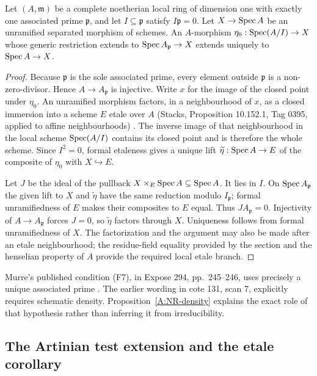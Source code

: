 \begin{proposition}\label{A:NR-density}
Let $(A,\mathfrak m)$ be a complete noetherian local ring of dimension one
with exactly one associated prime $\mathfrak p$, and let $I\subseteq
\mathfrak p$ satisfy $I\mathfrak p=0$. Let $X\to\operatorname{Spec} A$ be an
unramified separated morphism of schemes. An $A$-morphism
$\eta_0:\operatorname{Spec}(A/I)\to X$ whose generic restriction extends to
$\operatorname{Spec} A_{\mathfrak p}\to X$ extends uniquely to $\operatorname{Spec} A\to X$.
\end{proposition}
\begin{proof}
Because $\mathfrak p$ is the sole associated prime, every element outside
$\mathfrak p$ is a non-zero-divisor. Hence $A\to A_{\mathfrak p}$ is
injective. Write $x$ for the image of the closed point under $\eta_0$.
An unramified morphism factors, in a neighbourhood of $x$, as a closed
immersion into a scheme $E$ etale over $A$ (Stacks, Proposition 10.152.1,
Tag 0395, applied to affine neighbourhoods) \cite{Stacks0395}. The inverse image of that
neighbourhood in the local scheme $\operatorname{Spec}(A/I)$ contains its closed point
and is therefore the whole scheme. Since $I^2=0$, formal etaleness gives
a unique lift $\widetilde\eta:\operatorname{Spec} A\to E$ of the composite of $\eta_0$
with $X\hookrightarrow E$.

Let $J$ be the ideal of the pullback $X\times_E\operatorname{Spec} A\subseteq\operatorname{Spec} A$.
It lies in $I$. On $\operatorname{Spec} A_{\mathfrak p}$ the given lift to $X$ and
$\widetilde\eta$ have the same reduction modulo $I_{\mathfrak p}$;
formal unramifiedness of $E$ makes their composites to $E$ equal.
Thus $J A_{\mathfrak p}=0$. Injectivity of $A\to A_{\mathfrak p}$
forces $J=0$, so $\widetilde\eta$ factors through $X$. Uniqueness follows
from formal unramifiedness of $X$. The factorization and the argument may
also be made after an etale neighbourhood; the residue-field equality
provided by the section and the henselian property of $A$ provide the
required local etale branch.
\end{proof}

Murre's published condition (F7), in Expose 294, pp.~245--246,
uses precisely a unique associated prime \cite{Murre1965}.
The earlier wording in cote 131, scan 7, explicitly requires schematic
density. Proposition~\ref{A:NR-density} explains the exact role of that
hypothesis rather than inferring it from irreducibility.

\subsection{The Artinian test extension and the etale corollary}

